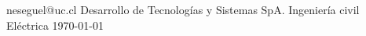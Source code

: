 \documentclass{style}
\begin{document}
\graphicspath{ {./img/} }

        {neseguel@uc.cl} %
        {Desarrollo de Tecnologías y Sistemas SpA.}
        {Ingeniería civil Eléctrica} %
        {\today} %



\tableofcontents \newpage
\listoftables \newpage
\listoffigures \newpage





\newpage



\end{document}
